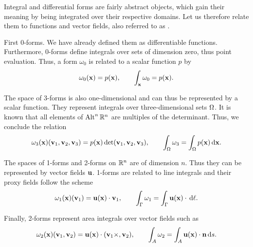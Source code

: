 \begin{remark}
  Integral and differential forms are fairly abstract objects, which
  gain their meaning by being integrated over their respective
  domains. Let us therefore relate them to functions and vector
  fields, also referred to as .

  First 0-forms. We have already defined them as differentiable
  functions. Furthermore, 0-forms define integrals over sets of
  dimension zero, thus point evaluation.
  Thus, a form $\omega_0$ is related to a scalar function $p$ by
  \begin{gather}
    \omega_0(\mathbf x) = p(\mathbf x),\qquad \int_\mathbf x \omega_0 = p(\mathbf x).
  \end{gather}

  The space of 3-forms is also one-dimensional and can thus be
  represented by a scalar function. They represent integrals over
  three-dimensional sets $\Omega$. It is known that all elements of
  $\operatorname{Alt}^n\mathbb R^n$ are multiples of the determinant. Thus, we conclude the
  relation
  \begin{gather}
    \omega_3(\mathbf x)(\mathbf v_1,\mathbf v_2,\mathbf v_3) = p(\mathbf x) \det(\mathbf v_1,\mathbf v_2,\mathbf v_3)
    ,\qquad \int_\Omega \omega_3 = \int_\Omega p(\mathbf x) \,\mathrm{d} \mathbf x.
  \end{gather}

  The spaces of 1-forms and 2-forms on $\mathbb R^n$ are of dimension
  $n$. Thus they can be represented by vector fields $\mathbf u$. 1-forms are
  related to line integrals and their proxy fields follow the scheme
  \begin{gather}
    \omega_1(\mathbf x)(\mathbf v_1) = \mathbf u(\mathbf x) \cdot \mathbf v_1
    ,\qquad \int_\Gamma \omega_1 = \int_\Gamma \mathbf u(\mathbf x) \cdot \,\mathrm{d} \ell.
  \end{gather}

  Finally, 2-forms represent area integrals over vector fields such as
  \begin{gather}
    \omega_2(\mathbf x)(\mathbf v_1,\mathbf v_2) = \mathbf u(\mathbf x) \cdot (\mathbf v_1 \times ,\mathbf v_2)
    ,\qquad \int_A \omega_2 = \int_A \mathbf u(\mathbf x) \cdot \mathbf n \,\mathrm{d} s.
  \end{gather}
\end{remark}


